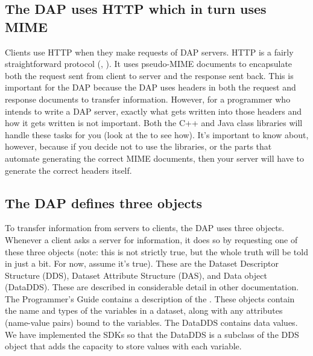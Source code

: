 \documentclass{dods-paper}
\begin{document}
\subsection{The DAP uses HTTP which in turn uses MIME}

Clients use HTTP when they make requests of DAP servers. HTTP is a fairly
straightforward protocol (, ).
It uses pseudo-MIME documents to encapsulate both the request sent from
client to server and the response sent back. This is important for the DAP
because the DAP uses headers in both the request and response
documents to transfer information. However, for a programmer who intends to
write a DAP server, exactly what gets written into those headers and how it
gets written is not important. Both the C++ and Java class libraries will
handle these tasks for you (look at the 
to see how). It's important to know about, however, because if you decide not
to use the libraries, or the parts that automate generating the correct MIME
documents, then your server will have to generate the correct headers itself.

\subsection{The DAP defines three objects}

To transfer information from servers to clients, the DAP uses three objects.
Whenever a client asks a server for information, it does so by requesting one
of these three objects (note: this is not strictly true, but the whole truth
will be told in just a bit. For now, assume it's true). These are the Dataset
Descriptor Structure (DDS), Dataset Attribute Structure (DAS), and Data
object (DataDDS). These are described in considerable detail in other
documentation. The Programmer's Guide contains a description of the
.
These objects contain the name and types of the variables in a dataset, along
with any attributes (name-value pairs) bound to the variables. The DataDDS
contains data values. We have implemented the SDKs so that the DataDDS is a
subclass of the DDS object that adds the capacity to store values with each
variable.
\end{document}
